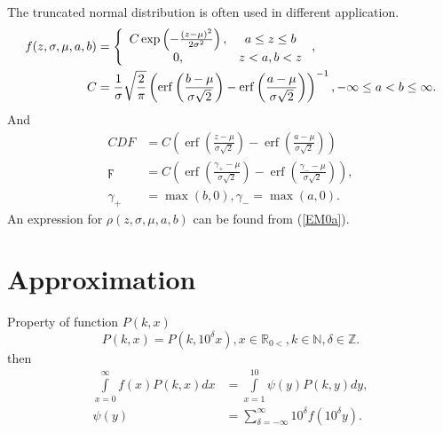 \documentclass[titlepage,fleqn]{article}%
\providecommand{\U}[1]{\protect\rule{.1in}{.1in}}
\begin{document}
The truncated normal distribution is often used in different application.
\begin{align*}
f(z,\sigma,\mu,a,b)  &  =\left\{
\begin{array}
[c]{cc}%
C\exp\left(  -\frac{(z-\mu)^{2}}{2\sigma^{2}}\right)  , & a\leq z\leq b\\
0, & z<a,b<z
\end{array}
\right.  ,\\
C  &  =\frac{1}{\sigma}\sqrt{\frac{2}{\pi}}\left(  \operatorname{erf}\left(
\frac{b-\mu}{\sigma\sqrt{2}}\right)  -\operatorname{erf}\left(  \frac{a-\mu
}{\sigma\sqrt{2}}\right)  \right)  ^{-1},-\infty\leq a<b\leq\infty.
\end{align*}
And%
\begin{align*}
CDF  &  =C\left(  \operatorname{erf}\left(  \frac{z-\mu}{\sigma\sqrt{2}%
}\right)  -\operatorname{erf}\left(  \frac{a-\mu}{\sigma\sqrt{2}}\right)
\right) \\
\digamma &  =C\left(  \operatorname{erf}\left(  \frac{\gamma_{+}-\mu}%
{\sigma\sqrt{2}}\right)  -\operatorname{erf}\left(  \frac{\gamma_{-}-\mu
}{\sigma\sqrt{2}}\right)  \right)  ,\\
\gamma_{+}  &  =\max(b,0),\gamma_{-}=\max(a,0).
\end{align*}
An expression for $\rho(z,\sigma,\mu,a,b)$ can be found from (\ref{EM0a}).

\section{Approximation}%

\label{Approximation}%


\bigskip Property of function $P(k,x)$%
\[
P(k,x)=P(k,10^{\delta}x),x\in%
\mathbb{R}
_{0<},k\in%
\mathbb{N}
,\delta\in%
\mathbb{Z}
.
\]
then%
\begin{align*}%
{\displaystyle\int\limits_{x=0}^{\infty}}
f(x)P(k,x)dx  &  =%
{\displaystyle\int\limits_{x=1}^{10}}
\psi(y)P(k,y)dy,\\
\psi(y)  &  =%
{\displaystyle\sum\limits_{\delta=-\infty}^{\infty}}
10^{\delta}f\left(  10^{\delta}y\right)  .
\end{align*}
\end{document}
